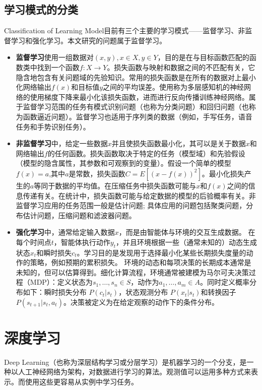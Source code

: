 \subsection{学习模式的分类}{Classification of Learning Model}\cite{ wiki:Artificial_neural_network}目前有三个主要的学习模式——监督学习、非监督学习和强化学习。本文研究的问题属于监督学习。
\begin{itemize}
  \item \textbf{监督学习}使用一组数据对$(x, y), x \in X, y \in Y$，目的是在与目标函数匹配的函数类中找到一个函数$f : X \rightarrow Y$。损失函数与映射和数据之间的不匹配有关，它隐含地包含有关问题域的先验知识。常用的损失函数是在所有的数据对上最小化网络输出$f(x)$和目标值$y$之间的平均误差。使用称为多层感知机的神经网络的使用梯度下降来最小化该损失函数，进而进行反向传播训练神经网络。属于监督学习范围的任务有模式识别问题（也称为分类问题）和回归问题（也称为函数逼近问题）。监督学习也适用于序列类的数据（例如，手写任务，语音任务和手势识别任务）。
  \item \textbf{非监督学习}中，给定一些数据$x$并且使损失函数最小化，其可以是关于数据$x$和网络输出$f$的任何函数。损失函数取决于特定的任务（模型域）和先验假设（模型的隐含属性，其参数和可观察到的变量）。假设一个简单的模型$f(x)=a$,其中$a$是常数，损失函数$C=E\left[(x-f(x))^{2}\right]$。最小化损失产生的$a$等同于数据的平均值。在压缩任务中损失函数可能与$x$和$f(x)$之间的信息传递有关。在统计中，损失函数可能与给定数据的模型的后验概率有关。非监督学习应用的任务范围一般是估计问题; 具体应用的问题包括聚类问题，分布估计问题，压缩问题和滤波器问题。
  \item \textbf{强化学习}中，通常给定输入数据$x$，而是由智能体与环境的交互生成数据。 在每个时间点$t$，智能体执行动作$y_{t}$，并且环境根据一些（通常未知的）动态生成状态$x_{t}$和瞬时损失$c_{t}$。学习目的是发现用于选择最小化某些长期损失度量的动作的策略，例如预期的累积损失。 环境的动态和每项决策的长期成本通常是未知的，但可以估算得到。细化计算流程，环境通常被建模为马尔可夫决策过程（MDP）：定义状态为$s_{1}, \dots, s_{n} \in S$，动作为$a_{1}, \dots, a_{m} \in A$。同时定义概率分布如下：瞬时损失分布
  $P\left(c_{t} | s_{t}\right)$，状态观测分布
  $P\left(x_{t}|s_{t}\right)$和转换因子$P\left(s_{t+1} | s_{t}, a_{t}\right)$。决策被定义为在给定观察的动作下的条件分布。
\end{itemize}

\section{深度学习}{Deep Learning}\cite{ wiki:Deep_learning}（也称为深层结构学习或分层学习）是机器学习的一个分支，是一种以人工神经网络为架构，对数据进行学习的算法。观测值可以运用多种方式来表示。而使用这些更容易从实例中学习任务。

